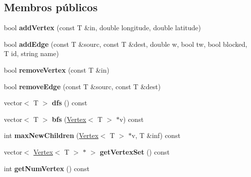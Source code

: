 \subsection*{Membros públicos}
\begin{DoxyCompactItemize}
\item 
\hypertarget{class_graph_a6283650774199e3dc971f226eb35cf50}{}bool {\bfseries add\+Vertex} (const T \&in, double longitude, double latitude)\label{class_graph_a6283650774199e3dc971f226eb35cf50}

\item 
\hypertarget{class_graph_add7835e0874b6bb515980db864e39a86}{}bool {\bfseries add\+Edge} (const T \&sourc, const T \&dest, double w, bool tw, bool blocked, T id, string name)\label{class_graph_add7835e0874b6bb515980db864e39a86}

\item 
\hypertarget{class_graph_af9c903104ad69a7782979fa9caedf163}{}bool {\bfseries remove\+Vertex} (const T \&in)\label{class_graph_af9c903104ad69a7782979fa9caedf163}

\item 
\hypertarget{class_graph_a1106092a37366486cf55576f9ec01692}{}bool {\bfseries remove\+Edge} (const T \&sourc, const T \&dest)\label{class_graph_a1106092a37366486cf55576f9ec01692}

\item 
\hypertarget{class_graph_a3f62ba0e37c5c011299c93d60e3a8be3}{}vector$<$ T $>$ {\bfseries dfs} () const \label{class_graph_a3f62ba0e37c5c011299c93d60e3a8be3}

\item 
\hypertarget{class_graph_a0e9598b98be2570eb432690411a577e8}{}vector$<$ T $>$ {\bfseries bfs} (\hyperlink{class_vertex}{Vertex}$<$ T $>$ $\ast$v) const \label{class_graph_a0e9598b98be2570eb432690411a577e8}

\item 
\hypertarget{class_graph_ab8fd74c3cf8dca6eaa82d39fd1216f52}{}int {\bfseries max\+New\+Children} (\hyperlink{class_vertex}{Vertex}$<$ T $>$ $\ast$v, T \&inf) const \label{class_graph_ab8fd74c3cf8dca6eaa82d39fd1216f52}

\item 
\hypertarget{class_graph_ab7dc5ec1c34df811d560021b726e95ec}{}vector$<$ \hyperlink{class_vertex}{Vertex}$<$ T $>$ $\ast$ $>$ {\bfseries get\+Vertex\+Set} () const \label{class_graph_ab7dc5ec1c34df811d560021b726e95ec}

\item 
\hypertarget{class_graph_a295932f117d92c825a97ec458e0fb332}{}int {\bfseries get\+Num\+Vertex} () const \label{class_graph_a295932f117d92c825a97ec458e0fb332}


\end{DoxyCompactItemize}
